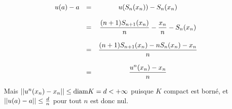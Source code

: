 {\begin{enumerate}
{$$\begin{array}{ccc}
         u(a)-a&=& u(S_n(x_n))-S_n(x_n)\\
&&\\

        &=&\displaystyle{(n+1)S_{n+1}(x_n)\over n}-{x_n\over n}-S_n(x_n)
\\
&&\\

&=&\displaystyle{(n+1)S_{n+1}(x_n)-nS_n(x_n)-x_n\over n}\\
&&\\
&=&\displaystyle{u^n(x_n)-x_n\over n}
\end{array}$$

Mais $||u^n(x_n)-x_n||\leq \hbox{diam} K=d<+\infty$ puisque $K$ compact est
borné, et 
$||u(a)-a||\leq {d\over n}$ pour tout $n$ est donc nul.}
\end{enumerate}
}